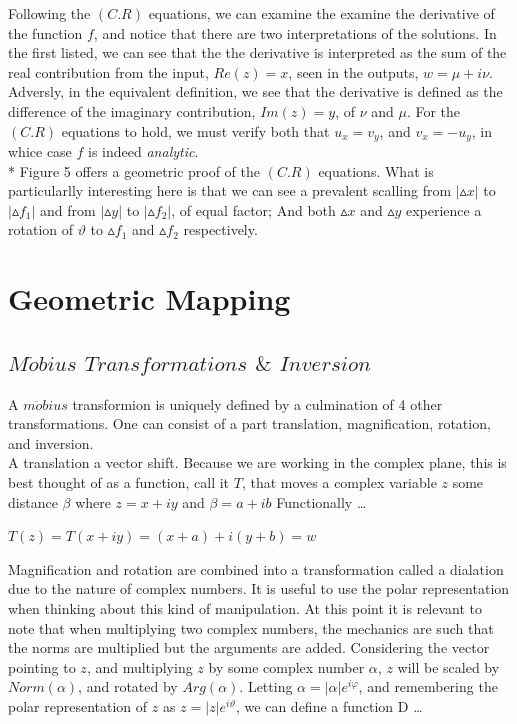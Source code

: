 \documentclass[a4paper,man,natbib]{apa6}
\begin{document}
Following the $ (C.R) $ equations, we can examine the examine the derivative of the function $ f $, and notice that there are two interpretations of the solutions.
In the first listed, we can see that the the derivative is interpreted as the sum of the real contribution from the input, $ Re(z) = x $, seen in the outputs, $ w = \mu + i\nu $.
Adversly, in the equivalent definition, we see that the derivative is defined as the difference of the imaginary contribution, $ Im(z) = y $, of $ \nu $ and $ \mu $.
For the $ (C.R) $ equations to hold, we must verify both that $ u_{x} = v_{y} $, and $ v_{x} = -u_{y} $, in whice case $ f $ is indeed \textit{analytic}. \\
* Figure 5 offers a geometric proof of the $ (C.R) $ equations.
What is particularlly interesting here is that we can see a prevalent scalling from $ |\vartriangle x| $ to $ |\vartriangle f_{1}| $ and from $ |\vartriangle y| $ to $ |\vartriangle f_{2}| $,
of equal factor; And both $ \vartriangle x $ and $ \vartriangle y $ experience a rotation of $ \vartheta $ to $ \vartriangle f_{1} $ and $ \vartriangle f_{2} $ respectively.

\section{Geometric Mapping}
\label{sec: Mapping}

\subsection{$ M\ddot{o}bius $ $ Transformations $ $ \& $ $ Inversion $}

A $ m\ddot{o}bius $ transformion is uniquely defined by a culmination of 4 other transformations. One can consist of a part translation, magnification, rotation, and inversion.
\\
A translation a vector shift. Because we are working in the complex plane, this is best thought of as a function, call it $ T $, that
moves a complex variable $ z $ some distance $ \beta $ where $ z = x + iy $ and $ \beta = a + ib $ Functionally \dots

\begin{center}

      $ T(z) = T(x + iy) = (x + a) + i(y +b) = w $

\end{center}

Magnification and rotation are combined into a transformation called a dialation due to the nature of complex numbers.
It is useful to use the polar representation when thinking about this kind of manipulation.
At this point it is relevant to note that when multiplying two complex numbers, the mechanics are such that the norms are multiplied but the arguments are added.
Considering the vector pointing to $ z $, and multiplying $ z $ by some complex number $ \alpha $, $ z $ will be scaled by $ Norm(\alpha) $, and rotated by $ Arg(\alpha) $.
Letting $ \alpha = |\alpha |e^{i\varphi} $, and remembering the polar representation of $ z $ as $ z = |z|e^{i\vartheta} $, we can define a function D \dots
\end{document}
